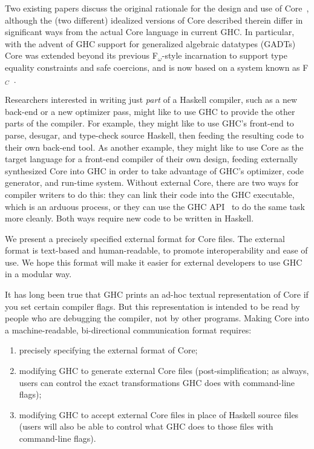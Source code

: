 \documentclass[10pt]{article}
\begin{document}
Two existing papers discuss the original rationale for the design and use of Core~\citep{ghc-inliner,comp-by-trans-scp}, although the (two different)
idealized versions of Core described therein differ in significant ways from the actual Core language in current GHC. In particular, with the advent of GHC support for generalized algebraic datatypes (GADTs)~\citep{gadts} Core was extended beyond its previous F$_\omega$-style incarnation to support type equality constraints and safe coercions, and is now based on a system known as F$_C$~\citep{system-fc}.


Researchers interested in writing just {\it part} of a Haskell compiler,
such as a new back-end or a new optimizer pass, might like to use GHC to provide the other parts of the compiler.  For example, they
might like to use GHC's front-end to parse, desugar, and type-check source Haskell,
then feeding the resulting code to their own back-end tool. As another example, they might like to use Core as the target language for a front-end compiler of their own design, feeding externally synthesized Core into GHC in order to take advantage of GHC's optimizer, code generator, and run-time system. Without external Core, there are two ways for compiler writers to do this: they can link their code into the
GHC executable, which is an arduous process, or they can use the GHC API~\citep{ghc-api} to do the same task more cleanly. Both ways require new code to be written in Haskell.

We present a precisely specified external format for Core files. The external format is text-based and human-readable, to promote interoperability and ease of use. We hope this format will make it easier for external developers to use GHC in a modular way.

It has long been true that GHC prints an ad-hoc textual representation of Core if you set certain compiler flags. But this representation is intended to be read by people who are debugging the compiler, not by other programs. Making Core into a machine-readable, bi-directional communication format requires:

\begin{enumerate}
\item precisely specifying the external format of Core;

\item modifying GHC to generate external Core files (post-simplification; as always, users can control the exact transformations GHC does with command-line flags);

\item modifying GHC to accept external Core files in place of Haskell 
source files (users will also be able to control what GHC does to those files with command-line flags).

\end{enumerate}
\end{document}
